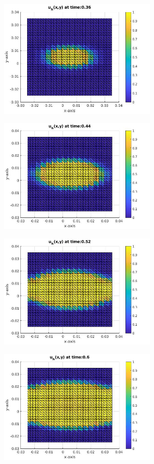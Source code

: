 \documentclass[a4paper,11pt]{article}
\begin{document}
\begin{figure}[h]
\begin{subfigure}{0.4\textwidth}
	\end{subfigure}
	\begin{subfigure}{0.4\textwidth}
		\includegraphics[width = 8cm]{./tc2-2/036.jpg}
	\end{subfigure}
	\begin{subfigure}{0.4\textwidth}
		\includegraphics[width =8cm]{./tc2-2/044.jpg}
	\end{subfigure}
	\begin{subfigure}{0.4\textwidth}
		\includegraphics[width = 8cm]{./tc2-2/052.jpg}
	\end{subfigure}
	\begin{subfigure}{0.4\textwidth}
		\includegraphics[width =8cm]{./tc2-2/060.jpg}
	\end{subfigure}
\end{figure}
\restoregeometry
\newpage
\end{document}
